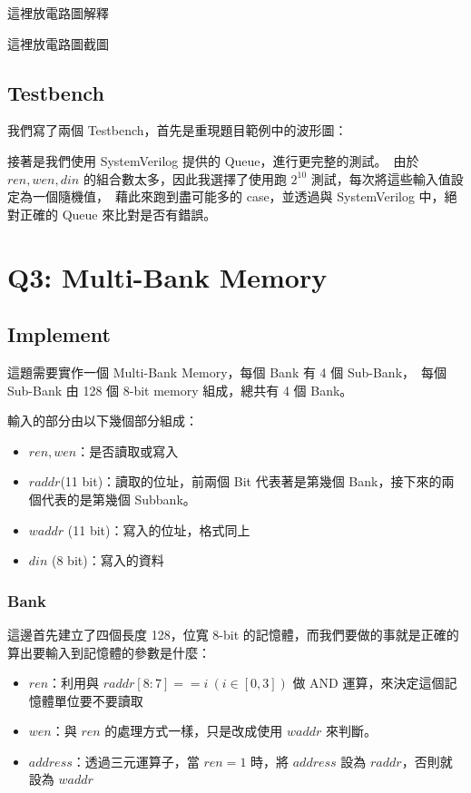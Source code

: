 \documentclass[10.5pt,compsoc,UTF8]{CjC}
\theoremstyle{mystyle}
\begin{document}
這裡放電路圖解釋

這裡放電路圖截圖

\subsection{Testbench}
我們寫了兩個 Testbench，首先是重現題目範例中的波形圖：


接著是我們使用 SystemVerilog 提供的 Queue，進行更完整的測試。\
由於 $ren, wen, din$ 的組合數太多，因此我選擇了使用跑 $2^10$ 測試，每次將這些輸入值設定為一個隨機值，\
藉此來跑到盡可能多的 case，並透過與 SystemVerilog 中，絕對正確的 Queue 來比對是否有錯誤。


\section{Q3: Multi-Bank Memory}
\label{sec:Q3}

\subsection{Implement}

這題需要實作一個 Multi-Bank Memory，每個 Bank 有 4 個 Sub-Bank，\
每個 Sub-Bank 由 128 個 8-bit memory 組成，總共有 4 個 Bank。

輸入的部分由以下幾個部分組成：
\begin{itemize}
  \item $ren, wen$：是否讀取或寫入
  \item $raddr$(11 bit)：讀取的位址，前兩個 Bit 代表著是第幾個 Bank，接下來的兩個代表的是第幾個 Subbank。
  \item $waddr$ (11 bit)：寫入的位址，格式同上
  \item $din$ (8 bit)：寫入的資料
\end{itemize}



\subsubsection*{Bank}

這邊首先建立了四個長度 128，位寬 8-bit 的記憶體，而我們要做的事就是正確的算出要輸入到記憶體的參數是什麼：
\begin{itemize}
  \item $ren$：利用與 $raddr[8:7] == i\ (i \in [0, 3])$ 做 AND 運算，來決定這個記憶體單位要不要讀取
  \item $wen$：與 $ren$ 的處理方式一樣，只是改成使用 $waddr$ 來判斷。
  \item $address$：透過三元運算子，當 $ren = 1$ 時，將 $address$ 設為 $raddr$，否則就設為 $waddr$
\end{itemize}
\end{document}
